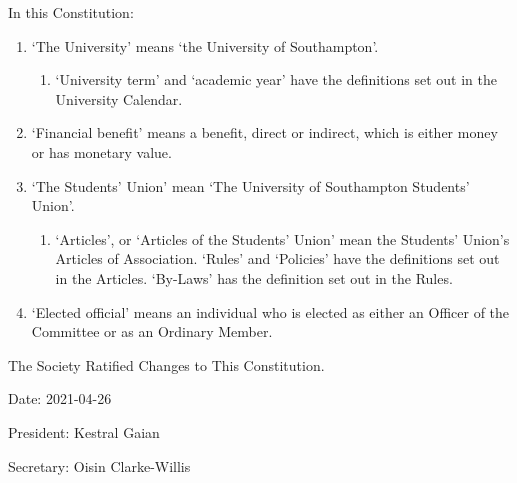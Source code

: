 \documentclass[12pt]{constitution}
\begin{document}
In this Constitution:
\begin{enumerate}
    \item `The University' means `the University of Southampton'.
    \begin{enumerate}
        \item `University term' and `academic year' have the definitions set out in the University Calendar.
    \end{enumerate}

    \item `Financial benefit' means a benefit, direct or indirect, which is either money or has monetary value.
    \item `The Students' Union' mean `The University of Southampton Students' Union'.
    \begin{enumerate}
        \item `Articles', or `Articles of the Students' Union' mean the Students' Union's Articles of Association. `Rules' and `Policies' have the definitions set out in the Articles. `By-Laws' has the definition set out in the Rules.
    \end{enumerate}
    
    \item `Elected official' means an individual who is elected as either an Officer of the Committee or as an Ordinary Member.
\end{enumerate}


\label{article:declaration}

The Society Ratified Changes to This Constitution.

Date: 2021-04-26

President: Kestral Gaian

Secretary: Oisin Clarke-Willis
\end{document}
